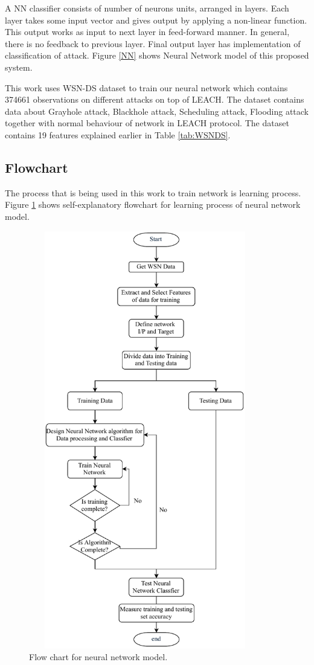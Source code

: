     A NN classifier consists of number of neurons units, arranged in layers. Each layer takes some input vector and gives output by applying a non-linear function. This output works as input to next layer in feed-forward manner. In general, there is no feedback to previous layer. Final output layer has implementation of classification of attack. Figure \ref{NN} shows Neural Network model of this proposed system.
    \par This work uses WSN-DS dataset to train our neural network which contains 374661 observations on different attacks on top of LEACH. The dataset contains data about Grayhole attack, Blackhole attack, Scheduling attack, Flooding attack together with normal behaviour of network in LEACH protocol. The dataset contains 19 features explained earlier in Table \ref{tab:WSNDS}.
    \subsection{Flowchart}
    The process that is being used in this work to train network is learning process. Figure \ref{FlowChart} shows self-explanatory flowchart for learning process of neural network model.
        \begin{figure}[hbp]
        \center	
        \includegraphics[width=4in, height=7.2in] {Figures/PDF/FlowChart.pdf}
        \caption{Flow chart for neural network model.}
        \label{FlowChart}	
        \end{figure}


